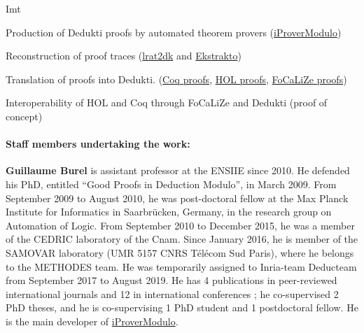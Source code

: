\begin{sitedescription}{Imt}
\begin{compactitem}
\item Production of Dedukti proofs by automated theorem provers (\href{http://www.ensiie.fr/~guillaume.burel/blackandwhite_iProverModulo.html.en}{iProverModulo})
\item Reconstruction of proof traces
  (\href{https://github.com/gburel/lrat2dk}{lrat2dk} and \href{https://github.com/Deducteam/ekstrakto}{Ekstrakto})
\item Translation of proofs into Dedukti. (\href{http://www.ensiie.fr/~guillaume.burel/blackandwhite_coqInE.html.en}{Coq
  proofs}, \href{http://deducteam.gforge.inria.fr/holide/}{HOL
  proofs}, \href{http://deducteam.gforge.inria.fr/focalide/}{FoCaLiZe proofs})
  \item Interoperability of HOL and Coq through FoCaLiZe and Dedukti (proof of concept)
\end{compactitem}

\paragraph*{Staff members undertaking the work:}

\begin{compactitem} %

\item{\bf Guillaume Burel}
 is
assistant professor at the ENSIIE since 2010. He defended his PhD,
entitled ``Good Proofs in Deduction Modulo'', in March 2009. From
September 2009 to August 2010, he was post-doctoral fellow at the Max
Planck Institute for Informatics in Saarbr\"ucken, Germany, in the
research group on Automation of Logic. From September 2010 to December
2015, he was a member of the CEDRIC laboratory of the Cnam. Since
January 2016, he is member of the SAMOVAR laboratory (UMR 5157 CNRS
T\'el\'ecom Sud Paris), where he belongs to the METHODES team. He was
temporarily assigned to Inria-team Deducteam from September 2017 to
August 2019.  He has 4
publications in peer-reviewed international journals and 12 in
international conferences ; he co-supervised 2 PhD theses, and he is
co-supervising 1 PhD student and 1 postdoctoral fellow. He is the
main developer of
\href{http://www.ensiie.fr/~guillaume.burel/blackandwhite_iProverModulo.html.en}{iProverModulo}.


\end{compactitem}
\end{sitedescription}
